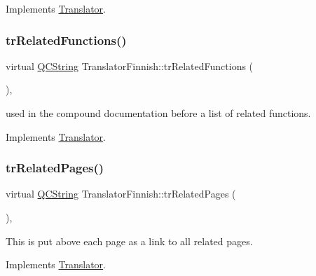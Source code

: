 Implements \mbox{\hyperlink{class_translator}{Translator}}.

\mbox{\label{class_translator_finnish_a3324fd72884c88ba4df776e7188022d3}} 
\subsubsection{\texorpdfstring{trRelatedFunctions()}{trRelatedFunctions()}}
{\footnotesize\ttfamily virtual \mbox{\hyperlink{class_q_c_string}{Q\+C\+String}} Translator\+Finnish\+::tr\+Related\+Functions (\begin{DoxyParamCaption}{ }\end{DoxyParamCaption})\hspace{0.3cm}{\ttfamily [inline]}, {\ttfamily [virtual]}}

used in the compound documentation before a list of related functions. 

Implements \mbox{\hyperlink{class_translator}{Translator}}.

\mbox{\label{class_translator_finnish_a44fd7c83355408b12744b61b63c6e387}} 
\subsubsection{\texorpdfstring{trRelatedPages()}{trRelatedPages()}}
{\footnotesize\ttfamily virtual \mbox{\hyperlink{class_q_c_string}{Q\+C\+String}} Translator\+Finnish\+::tr\+Related\+Pages (\begin{DoxyParamCaption}{ }\end{DoxyParamCaption})\hspace{0.3cm}{\ttfamily [inline]}, {\ttfamily [virtual]}}

This is put above each page as a link to all related pages. 

Implements \mbox{\hyperlink{class_translator}{Translator}}.

\mbox{\label{class_translator_finnish_a6e07612503f0df6d5749faf87a71cec3}} 
